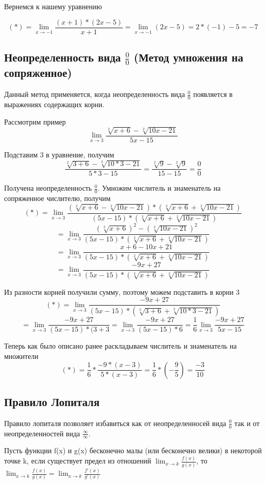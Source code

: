 \documentclass[12pt,a4paper]{article}
\begin{document}
Вернемся к нашему уравнению

$$ (*) = \lim_{x \to -1}\frac{(x+1)*(2x-5)}{x+1} = \lim_{x \to -1}(2x-5) = 2 * (-1) - 5 = -7 $$

\subsection{Неопределенность вида $\frac{0}{0}$ (Метод умножения на сопряженное)}
Данный метод применяется, когда неопределенность вида $\frac{0}{0}$ появляется в выражениях содержащих корни.

Рассмотрим пример
$$ \lim_{x \to 3}\frac{\sqrt[2]{x+6}-\sqrt[2]{10x-21}}{5x-15} $$

Подставим 3 в уравнение, получим
$$ \frac{\sqrt[2]{3+6}-\sqrt[2]{10*3-21}}{5*3-15} = \frac{\sqrt[2]{9}-\sqrt[2]{9}}{15-15} = \frac{0}{0} $$

Получена неопределенность $\frac{0}{0}$.
Умножим числитель и знаменатель на сопряженное числителю, получим
$$ (*) = \lim_{x \to 3}\frac{(\sqrt[2]{x+6}-\sqrt[2]{10x-21}) * (\sqrt[2]{x+6}+\sqrt[2]{10x-21})}{(5x-15) * (\sqrt[2]{x+6}+\sqrt[2]{10x-21})} $$
$$ = \lim_{x \to 3}\frac{(\sqrt[2]{x+6})^2 - (\sqrt[2]{10x-21})^2}{(5x-15) * (\sqrt[2]{x+6}+\sqrt[2]{10x-21})} $$
$$ = \lim_{x \to 3}\frac{x+6-10x+21}{(5x-15) * (\sqrt[2]{x+6}+\sqrt[2]{10x-21})} $$
$$ = \lim_{x \to 3}\frac{-9x+27}{(5x-15) * (\sqrt[2]{x+6}+\sqrt[2]{10x-21})} $$

Из разности корней получили сумму, поэтому можем подставить в корни 3
$$ (*) = \lim_{x \to 3}\frac{-9x+27}{(5x-15) * (\sqrt[2]{3+6}+\sqrt[2]{10 * 3 -21})} $$
$$ = \lim_{x \to 3}\frac{-9x+27}{(5x-15) * (3+3} = \lim_{x \to 3}\frac{-9x+27}{(5x-15) * 6}
= \frac{1}{6} \lim_{x \to 3}\frac{-9x+27}{5x-15} $$

Теперь как было описано ранее раскладываем числитель и знаменатель на множители
$$ (*) = \frac{1}{6} * \frac{-9 * (x-3)}{5*(x-3)} = \frac{1}{6} * (-\frac{9}{5}) = \frac{-3}{10}$$
\subsection{Правило Лопиталя}
Правило лопиталя позволяет избавиться как от неопределенносей вида $\frac{0}{0}$ так и от неопределенностей вида $\frac{\infty}{\infty}$.

Пусть функции f(x) и g(x) бесконечно малы (или бесконечно велики) в некоторой точке k, если существует предел из отношений $\lim_{x \to k}\frac{f(x)}{g(x)}$, то $\lim_{x \to k}\frac{f(x)}{g(x)} = \lim_{x \to k}\frac{f'(x)}{g'(x)}$
\end{document}
